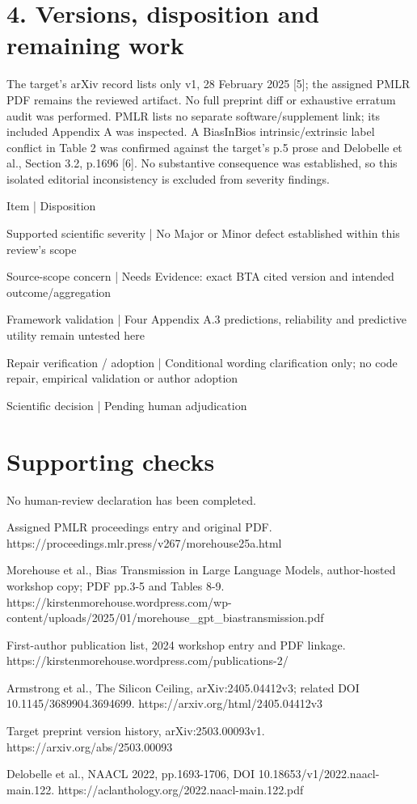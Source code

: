 \documentclass[10pt]{article}
\begin{document}
\section*{4. Versions, disposition and remaining work}
The target’s arXiv record lists only v1, 28 February 2025 [5]; the assigned PMLR PDF remains the reviewed artifact. No full preprint diff or exhaustive erratum audit was performed. PMLR lists no separate software/supplement link; its included Appendix A was inspected. A BiasInBios intrinsic/extrinsic label conflict in Table 2 was confirmed against the target’s p.5 prose and Delobelle et al., Section 3.2, p.1696 [6]. No substantive consequence was established, so this isolated editorial inconsistency is excluded from severity findings.\par
Item | Disposition\par
Supported scientific severity | No Major or Minor defect established within this review’s scope\par
Source-scope concern | Needs Evidence: exact BTA cited version and intended outcome/aggregation\par
Framework validation | Four Appendix A.3 predictions, reliability and predictive utility remain untested here\par
Repair verification / adoption | Conditional wording clarification only; no code repair, empirical validation or author adoption\par
Scientific decision | Pending human adjudication\par
\section*{Supporting checks}
No human-review declaration has been completed.\par
Assigned PMLR proceedings entry and original PDF. https://proceedings.mlr.press/v267/morehouse25a.html\par
Morehouse et al., Bias Transmission in Large Language Models, author-hosted workshop copy; PDF pp.3-5 and Tables 8-9. https://kirstenmorehouse.wordpress.com/wp-content/uploads/2025/01/morehouse\_gpt\_biastransmission.pdf\par
First-author publication list, 2024 workshop entry and PDF linkage. https://kirstenmorehouse.wordpress.com/publications-2/\par
Armstrong et al., The Silicon Ceiling, arXiv:2405.04412v3; related DOI 10.1145/3689904.3694699. https://arxiv.org/html/2405.04412v3\par
Target preprint version history, arXiv:2503.00093v1. https://arxiv.org/abs/2503.00093\par
Delobelle et al., NAACL 2022, pp.1693-1706, DOI 10.18653/v1/2022.naacl-main.122. https://aclanthology.org/2022.naacl-main.122.pdf\par
\end{document}
